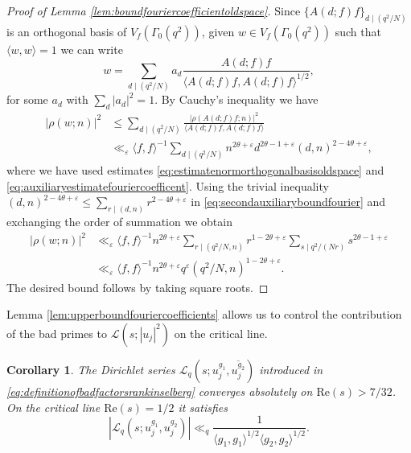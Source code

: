 \documentclass{article}
\newtheorem{cor}[thm]{Corollary}
\theoremstyle{named}
\renewcommand{\L}{\mathcal{L}}
\begin{document}
\begin{proof}[Proof of Lemma \ref{lem:boundfouriercoefficientoldspace}]
Since $\{A(d; f)f\}_{d \mid (q^2/N)}$ is an orthogonal basis of $V_f(\Gamma_0(q^2))$, given $w \in V_f(\Gamma_0(q^2))$ such that $\langle  w, w \rangle = 1$ we can write
\begin{equation*}
    w = \sum_{ d \mid (q^2/N)} a_d \frac{A(d; f)f}{\langle A(d; f)f, A(d; f)f\rangle^{1/2}},
\end{equation*}
for some $a_d$ with $\sum_{d}|a_d|^2 = 1$. By Cauchy's inequality we have
\begin{equation}\label{eq:secondauxiliaryboundfourier}
\begin{aligned}
    |\rho(w; n)|^2 & \leq \sum_{d \mid (q^2/N)}\frac{|\rho(A(d; f)f; n)|^2}{\langle A(d; f)f, A(d; f)f\rangle }\\
    & \ll_\varepsilon \langle f, f \rangle^{-1} \sum_{d \mid (q^2/N)} n^{2\theta + \varepsilon}d^{2\theta - 1 + \varepsilon} (d, n)^{2 - 4\theta + \varepsilon},
\end{aligned}
\end{equation}
where we have used estimates \eqref{eq:estimatenormorthogonalbasisoldspace} and \eqref{eq:auxiliaryestimatefouriercoefficent}. Using the trivial inequality $(d, n)^{2 - 4\theta + \varepsilon} \leq \sum_{r \mid (d, n)} r^{2 - 4\theta + \varepsilon}$ in \eqref{eq:secondauxiliaryboundfourier} and exchanging the order of summation we obtain
\begin{equation*}
\begin{aligned}
    |\rho(w; n)|^2 & \ll_\varepsilon \langle f, f \rangle^{-1}n^{2\theta + \varepsilon} \sum_{r \mid (q^2/N, n)} r^{1 - 2\theta + \varepsilon}\sum_{s \mid q^2/(Nr)} s^{2\theta - 1 + \varepsilon}\\
    & \ll_\varepsilon \langle f, f\rangle^{-1}n^{2\theta + \varepsilon} q^\varepsilon (q^2/N, n)^{1 - 2\theta + \varepsilon}.
\end{aligned}
\end{equation*}
The desired bound follows by taking square roots.
\end{proof}

Lemma \ref{lem:upperboundfouriercoefficients} allows us to control the contribution of the bad primes to $\L(s; |u_j|^2)$ on the critical line.
\begin{cor}\label{cor:boundrankinselbergbadprimes}
The Dirichlet series $\L_q(s; u_j^{g_1},  \overline{u_j^{g_2}})$ introduced in \eqref{eq:definitionofbadfactorsrankinselberg} converges absolutely on $\text{Re}(s) > 7/32$. On the critical line $\text{Re}(s) = 1/2$ it satisfies
\begin{equation*}
    |\L_q(s; u_j^{g_1},  u_j^{g_2})| \ll_{q} \frac{1}{\langle g_1, g_1 \rangle^{1/2}\langle g_2, g_2 \rangle^{1/2}}.
\end{equation*}
\end{cor}
\end{document}
